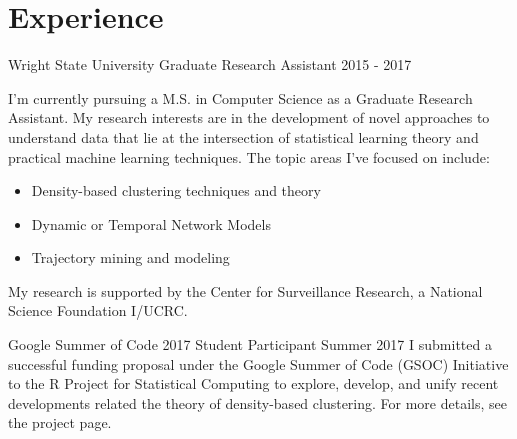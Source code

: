 \documentclass[11pt,a4paper,sans]{moderncv} %
\begin{document}

%


\section{Experience}

			 {Wright State University}
			 {Graduate Research Assistant}
			 {2015 - 2017}{}
{  \vspace{3pt}
I'm currently pursuing a M.S. in Computer Science as a Graduate Research Assistant. My research interests are in the development of novel approaches to understand data that lie at the intersection of statistical learning theory and practical machine learning techniques. The topic areas I've focused on include: 
	\begin{itemize}
		\item Density-based clustering techniques and theory 
		\item Dynamic or Temporal Network Models
		\item Trajectory mining and modeling
	\end{itemize}
	My research is supported by the Center for Surveillance Research, a National Science Foundation I/UCRC.
}


			 {Google Summer of Code 2017}
			 {Student Participant}
			 {Summer 2017}{}{\vspace{3pt} %
			 I submitted a successful funding proposal under the Google Summer of Code (GSOC) Initiative to the R Project for Statistical Computing to explore, develop, and unify recent developments related the theory of density-based clustering. For more details, see the project page\footnotemark. 
			 } 
\end{document}
